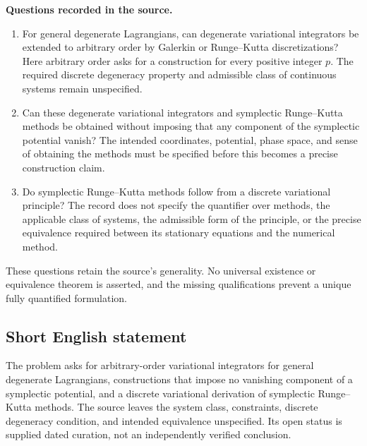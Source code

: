 \documentclass[11pt]{article}
\begin{document}
\textbf{Questions recorded in the source.}
\begin{enumerate}
\item For general degenerate Lagrangians, can degenerate variational integrators be extended to arbitrary order by Galerkin or Runge--Kutta discretizations? Here arbitrary order asks for a construction for every positive integer \(p\). The required discrete degeneracy property and admissible class of continuous systems remain unspecified.
\item Can these degenerate variational integrators and symplectic Runge--Kutta methods be obtained without imposing that any component of the symplectic potential vanish? The intended coordinates, potential, phase space, and sense of obtaining the methods must be specified before this becomes a precise construction claim.
\item Do symplectic Runge--Kutta methods follow from a discrete variational principle? The record does not specify the quantifier over methods, the applicable class of systems, the admissible form of the principle, or the precise equivalence required between its stationary equations and the numerical method.
\end{enumerate}
These questions retain the source's generality. No universal existence or equivalence theorem is asserted, and the missing qualifications prevent a unique fully quantified formulation.
\subsection{Short English statement}
The problem asks for arbitrary-order variational integrators for general degenerate Lagrangians, constructions that impose no vanishing component of a symplectic potential, and a discrete variational derivation of symplectic Runge--Kutta methods. The source leaves the system class, constraints, discrete degeneracy condition, and intended equivalence unspecified. Its open status is supplied dated curation, not an independently verified conclusion.
\end{document}
